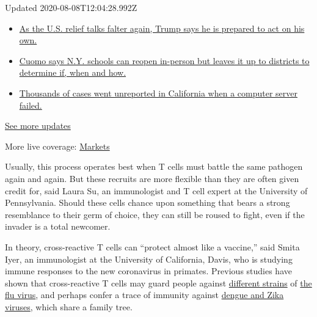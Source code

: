 Updated 2020-08-08T12:04:28.992Z

\begin{itemize}
\tightlist
\item
  \href{https://www.nytimes.com/2020/08/07/world/covid-19-news.html?action=click\&pgtype=Article\&state=default\&region=MAIN_CONTENT_1\&context=storylines_live_updates\#link-1f86d03a}{As
  the U.S. relief talks falter again, Trump says he is prepared to act
  on his own.}
\item
  \href{https://www.nytimes.com/2020/08/07/world/covid-19-news.html?action=click\&pgtype=Article\&state=default\&region=MAIN_CONTENT_1\&context=storylines_live_updates\#link-3f64a70a}{Cuomo
  says N.Y. schools can reopen in-person but leaves it up to districts
  to determine if, when and how.}
\item
  \href{https://www.nytimes.com/2020/08/07/world/covid-19-news.html?action=click\&pgtype=Article\&state=default\&region=MAIN_CONTENT_1\&context=storylines_live_updates\#link-14e70066}{Thousands
  of cases went unreported in California when a computer server failed.}
\end{itemize}

\href{https://www.nytimes.com/2020/08/07/world/covid-19-news.html?action=click\&pgtype=Article\&state=default\&region=MAIN_CONTENT_1\&context=storylines_live_updates}{See
more updates}

More live coverage:
\href{https://www.nytimes.com/live/2020/08/07/business/stock-market-today-coronavirus?action=click\&pgtype=Article\&state=default\&region=MAIN_CONTENT_1\&context=storylines_live_updates}{Markets}

Usually, this process operates best when T cells must battle the same
pathogen again and again. But these recruits are more flexible than they
are often given credit for, said Laura Su, an immunologist and T cell
expert at the University of Pennsylvania. Should these cells chance upon
something that bears a strong resemblance to their germ of choice, they
can still be roused to fight, even if the invader is a total newcomer.

In theory, cross-reactive T cells can ``protect almost like a vaccine,''
said Smita Iyer, an immunologist at the University of California, Davis,
who is studying immune responses to the new coronavirus in primates.
Previous studies have shown that cross-reactive T cells may guard people
against
\href{https://www.ncbi.nlm.nih.gov/pmc/articles/PMC6303473/}{different
strains} of
\href{https://www.ncbi.nlm.nih.gov/pmc/articles/PMC6458262/}{the flu
virus}, and perhaps confer a trace of immunity against
\href{https://www.frontiersin.org/articles/10.3389/fimmu.2020.00517/full}{dengue
and Zika viruses}, which share a family tree.

